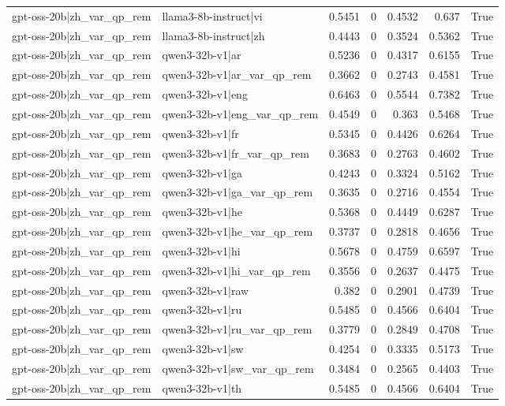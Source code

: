 \begin{table}
\begin{tabular}{l l r r r r l}
gpt-oss-20b|zh_var_qp_rem & llama3-8b-instruct|vi & 0.5451 & 0 & 0.4532 & 0.637 & True \\
gpt-oss-20b|zh_var_qp_rem & llama3-8b-instruct|zh & 0.4443 & 0 & 0.3524 & 0.5362 & True \\
gpt-oss-20b|zh_var_qp_rem & qwen3-32b-v1|ar & 0.5236 & 0 & 0.4317 & 0.6155 & True \\
gpt-oss-20b|zh_var_qp_rem & qwen3-32b-v1|ar_var_qp_rem & 0.3662 & 0 & 0.2743 & 0.4581 & True \\
gpt-oss-20b|zh_var_qp_rem & qwen3-32b-v1|eng & 0.6463 & 0 & 0.5544 & 0.7382 & True \\
gpt-oss-20b|zh_var_qp_rem & qwen3-32b-v1|eng_var_qp_rem & 0.4549 & 0 & 0.363 & 0.5468 & True \\
gpt-oss-20b|zh_var_qp_rem & qwen3-32b-v1|fr & 0.5345 & 0 & 0.4426 & 0.6264 & True \\
gpt-oss-20b|zh_var_qp_rem & qwen3-32b-v1|fr_var_qp_rem & 0.3683 & 0 & 0.2763 & 0.4602 & True \\
gpt-oss-20b|zh_var_qp_rem & qwen3-32b-v1|ga & 0.4243 & 0 & 0.3324 & 0.5162 & True \\
gpt-oss-20b|zh_var_qp_rem & qwen3-32b-v1|ga_var_qp_rem & 0.3635 & 0 & 0.2716 & 0.4554 & True \\
gpt-oss-20b|zh_var_qp_rem & qwen3-32b-v1|he & 0.5368 & 0 & 0.4449 & 0.6287 & True \\
gpt-oss-20b|zh_var_qp_rem & qwen3-32b-v1|he_var_qp_rem & 0.3737 & 0 & 0.2818 & 0.4656 & True \\
gpt-oss-20b|zh_var_qp_rem & qwen3-32b-v1|hi & 0.5678 & 0 & 0.4759 & 0.6597 & True \\
gpt-oss-20b|zh_var_qp_rem & qwen3-32b-v1|hi_var_qp_rem & 0.3556 & 0 & 0.2637 & 0.4475 & True \\
gpt-oss-20b|zh_var_qp_rem & qwen3-32b-v1|raw & 0.382 & 0 & 0.2901 & 0.4739 & True \\
gpt-oss-20b|zh_var_qp_rem & qwen3-32b-v1|ru & 0.5485 & 0 & 0.4566 & 0.6404 & True \\
gpt-oss-20b|zh_var_qp_rem & qwen3-32b-v1|ru_var_qp_rem & 0.3779 & 0 & 0.2849 & 0.4708 & True \\
gpt-oss-20b|zh_var_qp_rem & qwen3-32b-v1|sw & 0.4254 & 0 & 0.3335 & 0.5173 & True \\
gpt-oss-20b|zh_var_qp_rem & qwen3-32b-v1|sw_var_qp_rem & 0.3484 & 0 & 0.2565 & 0.4403 & True \\
gpt-oss-20b|zh_var_qp_rem & qwen3-32b-v1|th & 0.5485 & 0 & 0.4566 & 0.6404 & True \\

\end{tabular}
\end{table}
